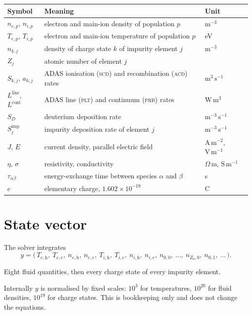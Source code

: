 \documentclass[11pt,a4paper]{article}
\newcommand{\h}{\mathrm{h}}
\newcommand{\co}{\mathrm{c}}
\begin{document}
\begin{center}
\begin{tabular}{@{}l>{\raggedright\arraybackslash}p{9.2cm}l@{}}
\toprule
Symbol & Meaning & Unit \\
\midrule
$n_{e,p}$, $n_{i,p}$ & electron and main-ion density of population $p$ & $\mathrm{m^{-3}}$ \\
$T_{e,p}$, $T_{i,p}$ & electron and main-ion temperature of population $p$ & eV \\
$n_{k,j}$ & density of charge state $k$ of impurity element $j$ & $\mathrm{m^{-3}}$ \\
$Z_j$ & atomic number of element $j$ & \\
$S_{k,j}$, $a_{k,j}$ & ADAS ionisation (\textsc{scd}) and recombination (\textsc{acd}) rates & $\mathrm{m^{3}\,s^{-1}}$ \\
$L^{\mathrm{line}}$, $L^{\mathrm{cont}}$ & ADAS line (\textsc{plt}) and continuum (\textsc{prb}) rates & $\mathrm{W\,m^{3}}$ \\
$S_D$ & deuterium deposition rate & $\mathrm{m^{-3}\,s^{-1}}$ \\
$S^{\mathrm{imp}}_j$ & impurity deposition rate of element $j$ & $\mathrm{m^{-3}\,s^{-1}}$ \\
$J$, $E$ & current density, parallel electric field & $\mathrm{A\,m^{-2}}$, $\mathrm{V\,m^{-1}}$ \\
$\eta$, $\sigma$ & resistivity, conductivity & $\Omega\,\mathrm{m}$, $\mathrm{S\,m^{-1}}$ \\
$\tau_{\alpha\beta}$ & energy-exchange time between species $\alpha$ and $\beta$ & s \\
$e$ & elementary charge, $1.602\times 10^{-19}$ & C \\
\bottomrule
\end{tabular}
\end{center}

\section{State vector}

The solver integrates
\[
  y = \bigl(\, T_{e,\h},\ T_{e,\co},\ n_{e,\h},\ n_{e,\co},\
               T_{i,\h},\ T_{i,\co},\ n_{i,\h},\ n_{i,\co},\
               n_{0,0},\ \dots,\ n_{Z_0,0},\ n_{0,1},\ \dots \,\bigr).
\]

Eight fluid quantities, then every charge state of every impurity element.

Internally $y$ is normalised by fixed scales: $10^3$ for temperatures, $10^{20}$ for fluid
densities, $10^{19}$ for charge states. This is bookkeeping only and does not change the
equations.
\end{document}

